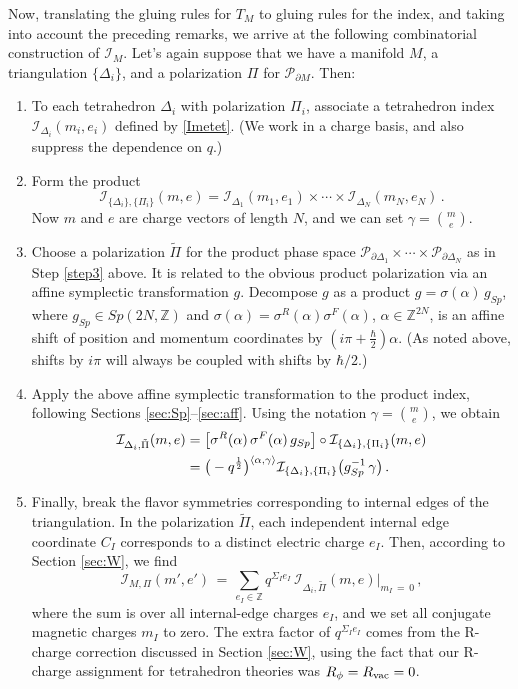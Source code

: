 \documentclass[11pt,letterpaper]{article}
\numberwithin{equation}{section}
\newcommand{\be}{\begin{equation}}
\newcommand{\ee}{\end{equation}}
\newcommand{\wt}{\widetilde}
\newcommand{\Z}{{\mathbb Z}}
\newcommand{\pd}{\partial}
\newcommand{\CI}{\mathcal{I}}
\newcommand{\CP}{\mathcal{P}}
\begin{document}
Now, translating the gluing rules for $T_M$ to gluing rules for the index, and taking into account the preceding remarks, we arrive at the following combinatorial construction of $\CI_M$. Let's again suppose that we have a manifold $M$, a triangulation $\{\Delta_i\}$, and a polarization $\Pi$ for $\CP_{\pd M}$. Then:
%
%
\begin{enumerate}

\item To each tetrahedron $\Delta_i$ with polarization $\Pi_i$, associate a tetrahedron index $\CI_{\Delta_i}(m_i,e_i)$ defined by \eqref{Imetet}. (We work in a charge basis, and also suppress the dependence on $q$.)


\item Form the product
%
\be \CI_{\{\Delta_i\},\{\Pi_i\}}(m,e) = \CI_{\Delta_1}(m_1,e_1)\times\cdots\times \CI_{\Delta_N}(m_N,e_N)\,. \ee
%
Now $m$ and $e$ are charge vectors of length $N$, and we can set $\gamma = {m \choose e}$.

\item Choose a polarization $\wt\Pi$ for the product phase space $\CP_{\pd\Delta_1}\times\cdots\times\CP_{\pd\Delta_N}$ as in Step \ref{step3} above. It is related to the obvious product polarization via an affine symplectic transformation $g$. Decompose $g$ as a product $g = \sigma(\alpha)\,g_{Sp}$, where $g_{Sp}\in Sp(2N,\Z)$ and $\sigma(\alpha) =\sigma^R(\alpha)\sigma^F(\alpha)$, $\alpha\in \Z^{2N}$, is an affine shift of position and momentum coordinates by $(i\pi+\tfrac\hbar2)\alpha$. (As noted above, shifts by $i\pi$ will always be coupled with shifts by $\hbar/2$.)

\item Apply the above affine symplectic transformation to the product index, following Sections \ref{sec:Sp}--\ref{sec:aff}. Using the notation $\gamma = {m\choose e}$, we obtain
%
\begin{align} \CI_{{\Delta_i},\tilde\Pi}(m,e) &= \big[\sigma^R(\alpha)\,\sigma^F(\alpha)\,g_{Sp}\big]\circ \CI_{\{\Delta_i\},\{\Pi_i\}}(m,e) \notag \\
 &= \big(-q^{\frac12}\big)^{\langle \alpha,\gamma\rangle} \CI_{\{\Delta_i\},\{\Pi_i\}}\big(g_{Sp}^{-1}\,\gamma\big)\,. \label{Iprod2}
 \end{align}

\item Finally, break the flavor symmetries corresponding to internal edges of the triangulation. In the polarization $\wt\Pi$, each independent internal edge coordinate $C_I$ corresponds to a distinct electric charge $e_I$. Then, according to Section \ref{sec:W}, we find
%
\be \CI_{M,\Pi}(m',e')\,=\, \sum_{e_I\in \Z} q^{\Sigma_Ie_I}\, \CI_{{\Delta_i},\tilde\Pi}(m,e)\Big|_{m_I\,=\,0}\,, \label{indsum} \ee
%
where the sum is over all internal-edge charges $e_I$, and we set all conjugate magnetic charges $m_I$ to zero. The extra factor of $q^{\Sigma_Ie_I}$ comes from the R-charge correction discussed in Section \ref{sec:W}, using the fact that our R-charge assignment for tetrahedron theories was $R_\phi = R_{\rm vac} = 0$.

\end{enumerate}
\end{document}
